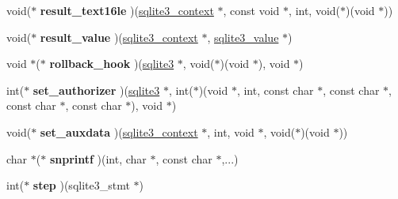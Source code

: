 \begin{DoxyCompactItemize}
\item 
\hypertarget{structsqlite3__api__routines_ac8f4c207ad255db5b0f8e0974fdcba16}{void($\ast$ {\bfseries result\-\_\-text16le} )(\hyperlink{structsqlite3__context}{sqlite3\-\_\-context} $\ast$, const void $\ast$, int, void($\ast$)(void $\ast$))}\label{structsqlite3__api__routines_ac8f4c207ad255db5b0f8e0974fdcba16}

\item 
\hypertarget{structsqlite3__api__routines_ae1ff210b0883098bb16c807e0dae6a80}{void($\ast$ {\bfseries result\-\_\-value} )(\hyperlink{structsqlite3__context}{sqlite3\-\_\-context} $\ast$, \hyperlink{struct_mem}{sqlite3\-\_\-value} $\ast$)}\label{structsqlite3__api__routines_ae1ff210b0883098bb16c807e0dae6a80}

\item 
\hypertarget{structsqlite3__api__routines_a980df7d8c480cf9f050e534d1d994efb}{void $\ast$($\ast$ {\bfseries rollback\-\_\-hook} )(\hyperlink{structsqlite3}{sqlite3} $\ast$, void($\ast$)(void $\ast$), void $\ast$)}\label{structsqlite3__api__routines_a980df7d8c480cf9f050e534d1d994efb}

\item 
\hypertarget{structsqlite3__api__routines_ad271da3c9d522555a4be69114f57de13}{int($\ast$ {\bfseries set\-\_\-authorizer} )(\hyperlink{structsqlite3}{sqlite3} $\ast$, int($\ast$)(void $\ast$, int, const char $\ast$, const char $\ast$, const char $\ast$, const char $\ast$), void $\ast$)}\label{structsqlite3__api__routines_ad271da3c9d522555a4be69114f57de13}

\item 
\hypertarget{structsqlite3__api__routines_a71c6f4befd8497adcf3bd78b720d4c6d}{void($\ast$ {\bfseries set\-\_\-auxdata} )(\hyperlink{structsqlite3__context}{sqlite3\-\_\-context} $\ast$, int, void $\ast$, void($\ast$)(void $\ast$))}\label{structsqlite3__api__routines_a71c6f4befd8497adcf3bd78b720d4c6d}

\item 
\hypertarget{structsqlite3__api__routines_a204fab9a7bbc4afa0ff208e0aca21afd}{char $\ast$($\ast$ {\bfseries snprintf} )(int, char $\ast$, const char $\ast$,...)}\label{structsqlite3__api__routines_a204fab9a7bbc4afa0ff208e0aca21afd}

\item 
\hypertarget{structsqlite3__api__routines_a40f899787bbfd866efa43f5337addbdc}{int($\ast$ {\bfseries step} )(sqlite3\-\_\-stmt $\ast$)}\label{structsqlite3__api__routines_a40f899787bbfd866efa43f5337addbdc}


\end{DoxyCompactItemize}
